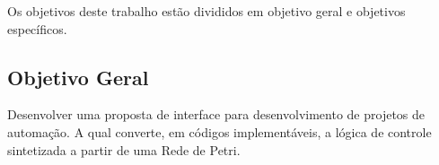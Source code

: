 





Os objetivos deste trabalho est\~ao divididos em objetivo geral e objetivos espec\'ificos.

\subsection{Objetivo Geral}

Desenvolver uma proposta de interface para desenvolvimento de projetos de automa\c{c}\~ao. A qual converte, em c\'odigos implement\'aveis, a l\'ogica de controle sintetizada a partir de uma Rede de Petri.



